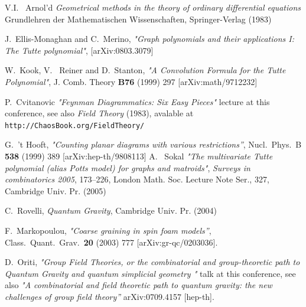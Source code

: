 \documentclass[10pt,here,feynmf]{article}
\begin{document}
\begin{thebibliography}{99}
V.I.~ Arnol'd {\it Geometrical methods in the theory of ordinary
  differential equations} Grundlehren der Mathematischen
Wissenschaften, Springer-Verlag  (1983)



J.~Ellis-Monaghan and C.~Merino,
{\it "Graph polynomials and their applications I: The Tutte polynomial"},
[arXiv:0803.3079]



W.~Kook, V.~ Reiner and D.~Stanton,
{\it "A Convolution Formula for the Tutte Polynomial"},
 J. Comb. Theory {\bf B76} (1999) 297
 [arXiv:math/9712232]



P.~Cvitanovic {\it"Feynman Diagrammatics: Six Easy Pieces"} lecture at this conference, see also
{\it Field Theory} (1983), avalable at {\tt http://ChaosBook.org/FieldTheory/}


  G.~'t Hooft,
  {\it "Counting planar diagrams with various restrictions''},
  Nucl.\ Phys.\  B {\bf 538} (1999) 389
  [arXiv:hep-th/9808113]
A.~ Sokal {\it "The multivariate Tutte polynomial (alias Potts model) for graphs and matroids"}, {\it Surveys in combinatorics 2005}, 173--226, London Math. Soc. Lecture Note Ser., 327, Cambridge Univ. Pr. (2005)


C.~Rovelli, {\it Quantum Gravity}, Cambridge Univ. Pr. (2004)

  
  F.~Markopoulou,
  {\it "Coarse graining in spin foam models''},
  Class.\ Quant.\ Grav.\  {\bf 20} (2003) 777
  [arXiv:gr-qc/0203036].

  D.~Oriti, {\it"Group Field Theories, or the combinatorial and group-theoretic path to Quantum Gravity
and quantum simplicial geometry
"} talk at this conference, see also
  {\it "A combinatorial and field theoretic path to quantum gravity: the new
  challenges of group field theory''}
  arXiv:0709.4157 [hep-th].
  



\end{thebibliography}
\end{document}
